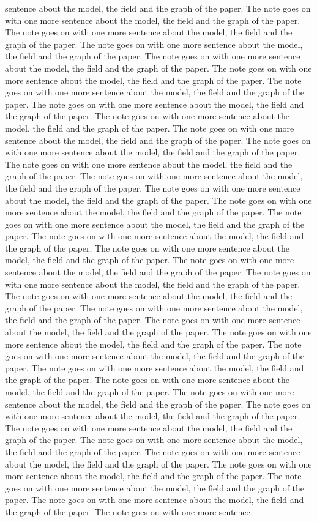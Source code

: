\documentclass{article}
\begin{document}
sentence about the model, the field and the graph of the paper. The note goes on with one more sentence about the model, the field and the graph of the paper. The note goes on with one more sentence about the model, the field and the graph of the paper. The note goes on with one more sentence about the model, the field and the graph of the paper. The note goes on with one more sentence about the model, the field and the graph of the paper. The note goes on with one more sentence about the model, the field and the graph of the paper. The note goes on with one more sentence about the model, the field and the graph of the paper. The note goes on with one more sentence about the model, the field and the graph of the paper. The note goes on with one more sentence about the model, the field and the graph of the paper. The note goes on with one more sentence about the model, the field and the graph of the paper. The note goes on with one more sentence about the model, the field and the graph of the paper. The note goes on with one more sentence about the model, the field and the graph of the paper. The note goes on with one more sentence about the model, the field and the graph of the paper. The note goes on with one more sentence about the model, the field and the graph of the paper. The note goes on with one more sentence about the model, the field and the graph of the paper. The note goes on with one more sentence about the model, the field and the graph of the paper. The note goes on with one more sentence about the model, the field and the graph of the paper. The note goes on with one more sentence about the model, the field and the graph of the paper. The note goes on with one more sentence about the model, the field and the graph of the paper. The note goes on with one more sentence about the model, the field and the graph of the paper. The note goes on with one more sentence about the model, the field and the graph of the paper. The note goes on with one more sentence about the model, the field and the graph of the paper. The note goes on with one more sentence about the model, the field and the graph of the paper. The note goes on with one more sentence about the model, the field and the graph of the paper. The note goes on with one more sentence about the model, the field and the graph of the paper. The note goes on with one more sentence about the model, the field and the graph of the paper. The note goes on with one more sentence about the model, the field and the graph of the paper. The note goes on with one more sentence about the model, the field and the graph of the paper. The note goes on with one more sentence about the model, the field and the graph of the paper. The note goes on with one more sentence about the model, the field and the graph of the paper. The note goes on with one more sentence about the model, the field and the graph of the paper. The note goes on with one more sentence about the model, the field and the graph of the paper. The note goes on with one more sentence about the model, the field and the graph of the paper. The note goes on with one more sentence about the model, the field and the graph of the paper. The note goes on with one more sentence about the model, the field and the graph of the paper. The note goes on with one more sentence 
\end{document}
